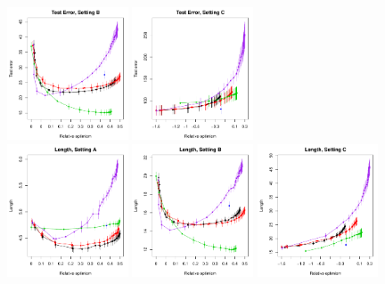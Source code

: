 \documentclass{article}
\begin{document}
\begin{figure}[p]
\includegraphics[width=0.32\textwidth]{fig_sim/B_err.pdf}
\includegraphics[width=0.32\textwidth]{fig_sim/C_err.pdf} \\
\includegraphics[width=0.32\textwidth]{fig_sim/A_len.pdf}
\includegraphics[width=0.32\textwidth]{fig_sim/B_len.pdf}
\includegraphics[width=0.32\textwidth]{fig_sim/C_len.pdf} 

\end{figure}
\end{document}

